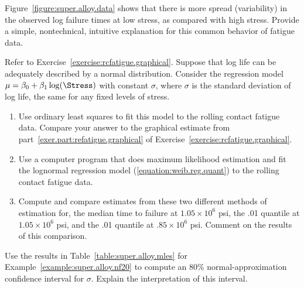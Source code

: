 \begin{exercise}
Figure~\ref{figure:super.alloy.data} shows that there is more spread 
(variability) in the
observed log failure times at low stress, as compared with high stress.
Provide a simple, nontechnical, intuitive explanation for this
common behavior of fatigue data.
\end{exercise} 

\begin{exercise1}
\label{exercise:rcfatigue.ls.ml}
Refer to Exercise~\ref{exercise:rcfatigue.graphical}.
Suppose that log life can be adequately described by a normal distribution.
Consider the regression model $\mu=\beta_{0}+\beta_{1}\log(\Stress)$
with constant $\sigma$, where $\sigma$ is the standard deviation of
log life, the same for any fixed levels of stress.
\begin{enumerate}
\item
Use ordinary least squares to fit this model to the rolling contact
fatigue data. Compare your answer to the graphical estimate from
part~\ref{exer.part:refatigue.graphical} of
Exercise~\ref{exercise:rcfatigue.graphical}.
\item
Use a computer program that does maximum likelihood estimation and fit
the lognormal regression model (\ref{equation:weib.reg.quant}) to the
rolling contact fatigue data.
\item
Compute and compare estimates from these two different methods of
estimation for, the median time to failure at $1.05 \times 10^{6}$
psi, the .01 quantile at $1.05 \times 10^{6}$ psi, and the .01
quantile at $.85 \times 10^{6}$ psi.  Comment on the results of this
comparison.
\end{enumerate}
\end{exercise1}

\begin{exercise}
Use the results in Table~\ref{table:super.alloy.mles} for
Example~\ref{example:super.alloy.nf20} to compute an 80\%
normal-approximation confidence interval for $\sigma$.  Explain the
interpretation of this interval.
\end{exercise}

